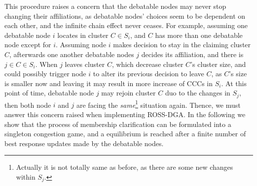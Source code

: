 \documentclass[10pt,journal,compsoc]{IEEEtran}
\theoremstyle{mytheoremstyle}
\theoremstyle{mytheoremstyle}
\theoremstyle{mytheoremstyle}
\begin{document}
This procedure raises a concern that the debatable nodes may never stop changing their affiliations, as debatable nodes' choices seem to be dependent on each other, and the infinite chain effect never ceases.
For example, assuming one debatable node $i$ locates in cluster $C\in S_i$, and $C$ has more than one debatable node except for $i$.
Assuming node $i$ makes decision to stay in the claiming cluster $C$, afterwards one another debatable nodes $j$ decides its affiliation, and there is $j\in C\in S_i$.
When $j$ leaves cluster $C$, which decrease cluster $C$'s cluster size, and could possibly trigger node $i$ to alter its previous decision to leave $C$, as $C$'s size is smaller now and leaving it may result in more increase of CCCs in $S_i$.
At this point of time, debatable node $j$ may rejoin cluster $C$ duo to the changes in $S_j$, then both node $i$ and $j$ are facing the \textit{same}\footnote{Actually it is not totally same as before, as there are some new changes within $S_j$.} situation again.
Thence, we must answer this concern raised when implementing ROSS-DGA.
In the following we show that the process of membership clarification can be formulated into a singleton congestion game, and a equilibrium is reached after a finite number of best response updates made by the debatable nodes.
\end{document}
